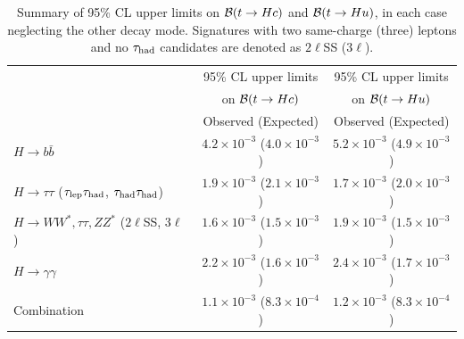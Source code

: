 \begin{table}[t!]
\begin{center}
\begin{tabular}{lcc}
\toprule\toprule
 & \multicolumn{1}{c}{95\% CL upper limits} & \multicolumn{1}{c}{95\% CL upper limits}  \\
 & \multicolumn{1}{c}{on $\mathcal{B}(t \to Hc)$} & \multicolumn{1}{c}{on $\mathcal{B}(t \to Hu)$} \\
 &  Observed (Expected) & Observed (Expected)  \\
\midrule\midrule
$H \to b\bar{b}$ & $4.2 \times 10^{-3}$ ($4.0 \times 10^{-3}$) & $5.2 \times 10^{-3}$ ($4.9 \times 10^{-3}$) \\
$H \to \tau\tau$ ($\tau_{\mathrm{lep}} \tau_{\mathrm{had}}$, $\tau_{\mathrm{had}} \tau_{\mathrm{had}}$) & $1.9 \times 10^{-3}$ ($2.1 \times 10^{-3}$) & $1.7 \times 10^{-3}$ ($2.0 \times 10^{-3}$) \\ 
$H \to WW^*, \tau\tau, ZZ^*$ ($2\ell$SS, $3\ell$)~\cite{Aaboud:2018pob}  & $1.6 \times 10^{-3}$ ($1.5 \times 10^{-3}$) & $1.9 \times 10^{-3}$ ($1.5 \times 10^{-3}$) \\ 
$H \to \gamma\gamma$~\cite{Aaboud:2017mfd} & $2.2 \times 10^{-3}$ ($1.6 \times 10^{-3}$) & $2.4 \times 10^{-3}$ ($1.7 \times 10^{-3}$) \\
\midrule
Combination  & $1.1 \times 10^{-3}$ ($8.3 \times 10^{-4}$) & $1.2 \times 10^{-3}$ ($8.3 \times 10^{-4}$) \\
\bottomrule\bottomrule
\end{tabular}
\caption{\small{Summary of 95\% CL upper limits on $\mathcal{B}(t \to Hc)$ and $\mathcal{B}(t \to Hu)$, in each case neglecting the other decay mode. Signatures with two same-charge (three) leptons and no $\tau_{\mathrm{had}}$ candidates
are denoted as $2\ell$SS ($3\ell$). }}
\label{tab:limits_summary}
\end{center}
\end{table}

